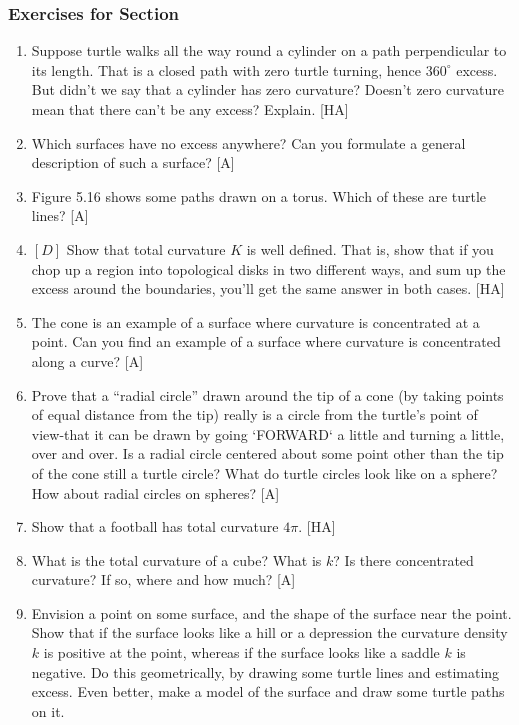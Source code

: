 \documentclass{book}
\begin{document}
\subsubsection{Exercises for Section \thesection}
\begin{enumerate}
\item Suppose turtle walks all the way round a cylinder on a path perpendicular to its length. That is a closed path with zero turtle turning,
hence $360^{\circ}$ excess. But didn't we say that a cylinder has zero curvature?
Doesn't zero curvature mean that there can't be any excess? Explain.
[HA]

\item Which surfaces have no excess anywhere? Can you formulate a
general description of such a surface? [A]

\item Figure 5.16 shows some paths drawn on a torus. Which of these are
turtle lines? [A]

\item $[D]$ Show that total curvature $K$ is well defined. That is, show that
if you chop up a region into topological disks in two different ways, and
sum up the excess around the boundaries, you'll get the same answer in
both cases. [HA]

\item The cone is an example of a surface where curvature is concentrated
at a point. Can you find an example of a surface where curvature is
concentrated along a curve? [A]

\item Prove that a ``radial circle'' drawn around the tip of a cone (by taking
points of equal distance from the tip) really is a circle from the turtle's
point of view-that it can be drawn by going \textsc{`FORWARD`} a little and turning
a little, over and over. Is a radial circle centered about some point
other than the tip of the cone still a turtle circle? What do turtle circles
look like on a sphere? How about radial circles on spheres? [A]

\item Show that a football has total curvature $4 \pi$. [HA]

\item What is the total curvature of a cube? What is $k$? Is there concentrated curvature? If so, where and how much? [A]

\item Envision a point on some surface, and the shape of the surface near
the point. Show that if the surface looks like a hill or a depression the
curvature density $k$ is positive at the point, whereas if the surface looks
like a saddle $k$ is negative. Do this geometrically, by drawing some turtle
lines and estimating excess. Even better, make a model of the surface
and draw some turtle paths on it.


\end{enumerate}
\end{document}

